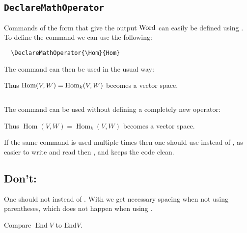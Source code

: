 \documentclass[a4paper, 10pt, abstract=on, headings=standardclasses]{scrartcl}
\begin{document}
\subsection{\texttt{DeclareMathOperator}}

Commands of the form  that give the output $\operatorname{Word}$ can easily be defined using .
To define the command  we can use the following:
\begin{lstlisting}
  \DeclareMathOperator{\Hom}{Hom}
\end{lstlisting}
The command  can then be used in the usual way:
\begin{LTXexample}[pos = b]
  Thus $\Hom(V,W) = \Hom_k(V,W)$ becomes a vector space.
\end{LTXexample}



\subsection{}

The command  can be used without defining a completely new operator:
\begin{LTXexample}[pos = b]
  Thus $\operatorname{Hom}(V,W) = \operatorname{Hom}_k(V,W)$ becomes a vector space.
\end{LTXexample}
If the same command is used multiple times then one should use  instead of , as  easier to write and read then , and keeps the code clean.



\subsection{Don’t: }

One should not  instead of .
With  we get necessary spacing when not using parentheses, which does not happen when using .
\begin{LTXexample}[pos = r]
  Compare $\operatorname{End} V$ to $\mathrm{End} V$.
\end{LTXexample}





\subsection{}
\end{document}
